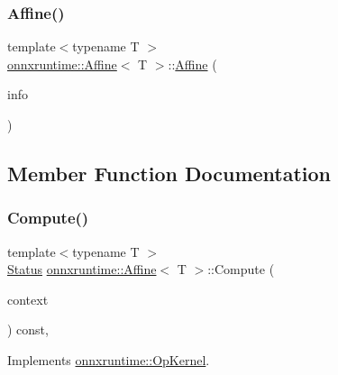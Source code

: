\subsubsection{\texorpdfstring{Affine()}{Affine()}}
{\footnotesize\ttfamily template$<$typename T $>$ \\
\mbox{\hyperlink{classonnxruntime_1_1Affine}{onnxruntime\+::\+Affine}}$<$ T $>$\+::\mbox{\hyperlink{classonnxruntime_1_1Affine}{Affine}} (\begin{DoxyParamCaption}\item[{const \mbox{\hyperlink{classonnxruntime_1_1OpKernelInfo}{Op\+Kernel\+Info}} \&}]{info }\end{DoxyParamCaption})\hspace{0.3cm}{\ttfamily [inline]}}



\subsection{Member Function Documentation}
\mbox{\label{classonnxruntime_1_1Affine_a0fef6fd3c2fb85468d959080b43dc683}} 
\subsubsection{\texorpdfstring{Compute()}{Compute()}\hspace{0.1cm}{\footnotesize\ttfamily [1/2]}}
{\footnotesize\ttfamily template$<$typename T $>$ \\
\mbox{\hyperlink{classonnxruntime_1_1common_1_1Status}{Status}} \mbox{\hyperlink{classonnxruntime_1_1Affine}{onnxruntime\+::\+Affine}}$<$ T $>$\+::Compute (\begin{DoxyParamCaption}\item[{\mbox{\hyperlink{classonnxruntime_1_1OpKernelContext}{Op\+Kernel\+Context}} $\ast$}]{context }\end{DoxyParamCaption}) const\hspace{0.3cm}{\ttfamily [override]}, {\ttfamily [virtual]}}



Implements \mbox{\hyperlink{classonnxruntime_1_1OpKernel_a9eca8656a78b1b3ab9d3351a12798650}{onnxruntime\+::\+Op\+Kernel}}.

\mbox{\label{classonnxruntime_1_1Affine_ad9bbf2b9b16c87c75c2fd81c818af1ff}} 
